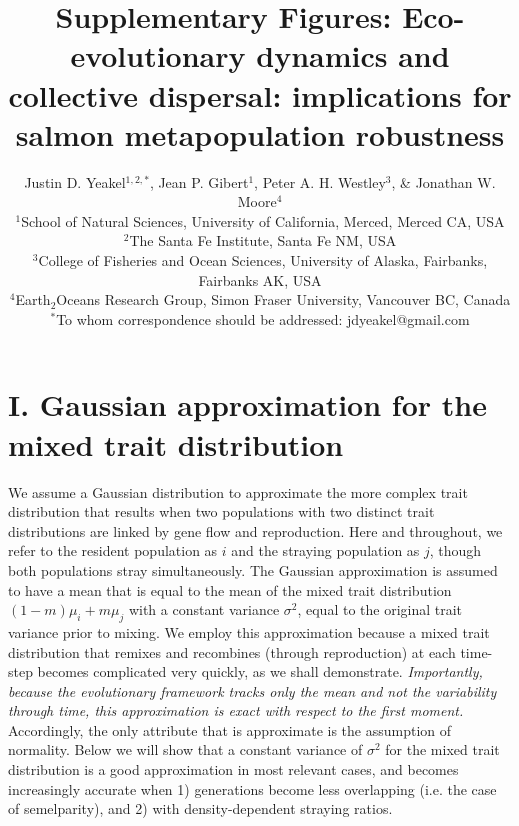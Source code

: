 \documentclass{revtex4}
\newcommand{\beginsupplement}{%
        \clearpage
        \setcounter{table}{0}
        \renewcommand{\thetable}{S\arabic{table}}%
        \setcounter{figure}{0}
        \renewcommand{\thefigure}{S\arabic{figure}}%
     }
\begin{document}
\title{Supplementary Figures: Eco-evolutionary dynamics and collective dispersal: implications for salmon metapopulation robustness}
\author{
Justin D. Yeakel${}^{1,2,*}$, Jean P. Gibert${}^{1}$, Peter A. H. Westley${}^{3}$, \& Jonathan W. Moore${}^{4}$ \\
${}^1$School of Natural Sciences, University of California, Merced, Merced CA, USA \\
${}^2$The Santa Fe Institute, Santa Fe NM, USA \\
${}^3$College of Fisheries and Ocean Sciences, University of Alaska, Fairbanks, Fairbanks AK, USA \\
${}^4$Earth${}_2$Oceans Research Group, Simon Fraser University, Vancouver BC, Canada \\
${}^*$To whom correspondence should be addressed: jdyeakel@gmail.com
}

\maketitle

\beginsupplement

\section*{I. Gaussian approximation for the mixed trait distribution}
We assume a Gaussian distribution to approximate the more complex trait distribution that results when two populations with two distinct trait distributions are linked by gene flow and reproduction.
Here and throughout, we refer to the resident population as $i$ and the straying population as $j$, though both populations stray simultaneously.
The Gaussian approximation is assumed to have a mean that is equal to the mean of the mixed trait distribution $(1-m)\mu_i + m\mu_j$ with a constant variance $\sigma^2$, equal to the original trait variance prior to mixing.
We employ this approximation because a mixed trait distribution that remixes and recombines (through reproduction) at each time-step becomes complicated very quickly, as we shall demonstrate.
\emph{Importantly, because the evolutionary framework tracks only the mean and not the variability through time, this approximation is exact with respect to the first moment.}
Accordingly, the only attribute that is approximate is the assumption of normality.
Below we will show that a constant variance of $\sigma^2$ for the mixed trait distribution is a good approximation in most relevant cases, and becomes increasingly accurate when 1) generations become less overlapping (i.e. the case of semelparity), and 2) with density-dependent straying ratios.
\end{document}
